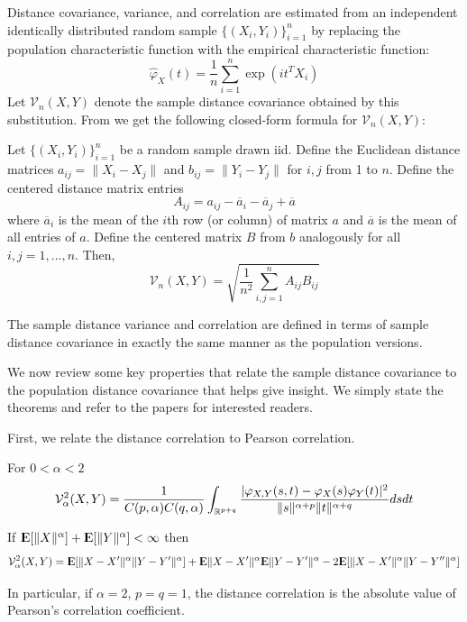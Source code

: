 Distance covariance, variance, and correlation are estimated from an
independent identically distributed random sample
$\{(X_i, Y_i)\}_{i=1}^n$ by replacing the population characteristic
function with the empirical characteristic function:
\[ \widehat{\varphi}_X (t) = \frac{1}{n} \sum_{i=1}^n \exp(i t^T X_i) \]
Let $\mathcal{V}_n(X,Y)$ denote the sample distance covariance obtained
by this substitution. From \cite{szekely2007measuring} we get the
following closed-form formula for $\mathcal{V}_n(X,Y)$:

\begin{theorem}
Let $\{(X_i, Y_i)\}_{i=1}^n$ be a random sample drawn iid. Define
the Euclidean distance matrices $a_{ij} = \|X_i - X_j\|$ and
$b_{ij} = \|Y_i - Y_j\|$ for $i,j$ from 1 to $n$. Define the centered
distance matrix entries
\[ A_{ij} = a_{ij} - \overline{a}_i - \overline{a}_j + \overline{a} \]
where $\overline{a}_i$ is the mean of the $i$th row (or column) of
matrix $a$ and $\overline{a}$ is the mean of all entries of $a$. Define
the centered matrix $B$ from $b$ analogously for all $i,j = 1, ..., n$.
Then,
\[ \mathcal{V}_n(X,Y) = \sqrt{\frac{1}{n^2}
                              \sum_{i,j=1}^n A_{ij} B_{ij}} \]
\end{theorem}

The sample distance variance and correlation are defined in terms of
sample distance covariance in exactly the same manner as the population
versions.

We now review some key properties that relate the sample distance
covariance to the population distance covariance that helps give
insight. We simply state the theorems and refer to the papers for
interested readers.

First, we relate the distance correlation to Pearson correlation.

\begin{definition}  
For $0 < \alpha < 2$
$$ \mathcal{V}_\alpha^2 (X,Y)
 = \frac{1}{C(p,\alpha) C(q,\alpha)}
   \int_{\mathbb{R}^{p+q}} \frac{|\varphi_{X,Y}(s,t) -
                          \varphi_X(s) \varphi_Y(t)|^2}
                        {\|s\|^{\alpha + p} \|t\|^{\alpha + q}} ds dt $$
\end{definition}

\begin{prop}
If ${\rm I\kern-.3em E}[\|X\|^\alpha] + {\rm I\kern-.3em E}[\|Y\|^\alpha] < \infty$ then
$$ \mathcal{V}_\alpha^2 (X,Y) = {\rm I\kern-.3em E}[ \|X - X'\|^\alpha \|Y - Y'\|^\alpha ] + {\rm I\kern-.3em E} \|X - X'\|^\alpha {\rm I\kern-.3em E} \|Y - Y'\|^\alpha - 2 {\rm I\kern-.3em E}[ \|X - X'\|^\alpha \|Y - Y''\|^\alpha ]$$

In particular, if $\alpha = 2$, $p = q = 1$, the distance correlation is 
the absolute value of Pearson's correlation coefficient.
\end{prop}

